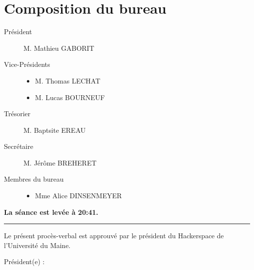 \documentclass[a4paper, 11pt]{article}
\newcommand\sep{\noindent\rule{\linewidth}{.5pt}}
\begin{document}
\section{Composition du bureau}
\begin{description}
  \item[Président] M. Mathieu GABORIT
  \item[Vice-Présidents] \hfill
 	\begin{itemize}
        \item M. Thomas LECHAT
        \item M. Lucas BOURNEUF
    \end{itemize}
  \item[Trésorier] M. Baptsite EREAU
  \item[Secrétaire] M. Jérôme BREHERET
  \item[Membres du bureau] \hfill
  	\begin{itemize}
        \item Mme Alice DINSENMEYER
    \end{itemize}
\end{description}

\textbf{La séance est levée à 20:41.}

\bigskip\bigskip

\sep

\bigskip\bigskip

Le présent procès-verbal est approuvé par le président du Hackerspace de l'Université du Maine.

\bigskip\bigskip

Président(e) :
\end{document}
